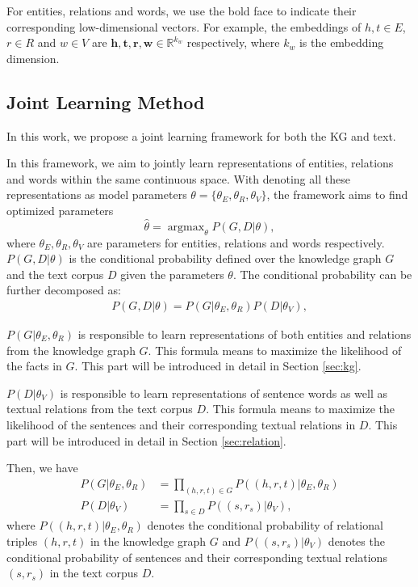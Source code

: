 \documentclass[11pt,a4paper]{article}
\begin{document}
For entities, relations and words, we use the bold face to indicate their corresponding low-dimensional vectors. For example, the embeddings of $h, t \in E$, $r \in R$ and $w \in V$ are $\mathbf{h}, \mathbf{t}, \mathbf{r}, \mathbf{w} \in \mathbb{R}^{k_w}$ respectively, where $k_w$ is the embedding dimension.


\subsection{Joint Learning Method}
\label{sec:joint}
In this work, we propose a joint learning framework for both the KG and text.

In this framework, we aim to jointly learn representations of entities, relations and words within the same continuous space. With denoting all these representations as model parameters $\theta = \{\theta_E, \theta_R, \theta_V\}$, the framework aims to find optimized parameters
\begin{equation}
\hat{\theta} = \mathop{\arg\max}_{\theta} P(G, D | {\theta}),
\end{equation}
where $\theta_E, \theta_R, \theta_V$ are parameters for entities, relations and words respectively. $P(G, D | {\theta})$ is the conditional probability defined over the knowledge graph $G$ and the text corpus $D$ given the parameters $\theta$. The conditional probability can be further decomposed as:
\begin{align}
\label{eq:topeq}
P(G,D|{\theta}) = P(G|{\theta_E,\theta_R})P(D|{\theta_V}),
\end{align}

$P(G|\theta_E, \theta_R)$ is responsible to learn representations of both entities and relations from the knowledge graph $G$. This formula means to maximize the likelihood of the facts in $G$. This part will be introduced in detail in Section \ref{sec:kg}. 

$P(D|{\theta_V})$ is responsible to learn representations of sentence words as well as textual relations from the text corpus $D$. This formula means to maximize the likelihood of the sentences and their corresponding textual relations in $D$. This part will be introduced in detail in Section \ref{sec:relation}. 

Then, we have
\begin{align}
 P(G|{\theta_E,\theta_R}) & = \prod_{(h,r,t) \in G}P((h, r, t)|{\theta_E, \theta_R}) \\
 P(D|{\theta_V}) & = \prod_{s \in D}P((s, r_s)|{\theta_V}),
\end{align}
where $P((h, r, t)|{\theta_E,\theta_R})$ denotes the conditional probability of relational triples $(h, r, t)$ in the knowledge graph $G$ and $P((s, r_s)|{\theta_V})$ denotes the conditional probability of sentences and their corresponding textual relations $(s, r_s)$ in the text corpus $D$.
\end{document}

